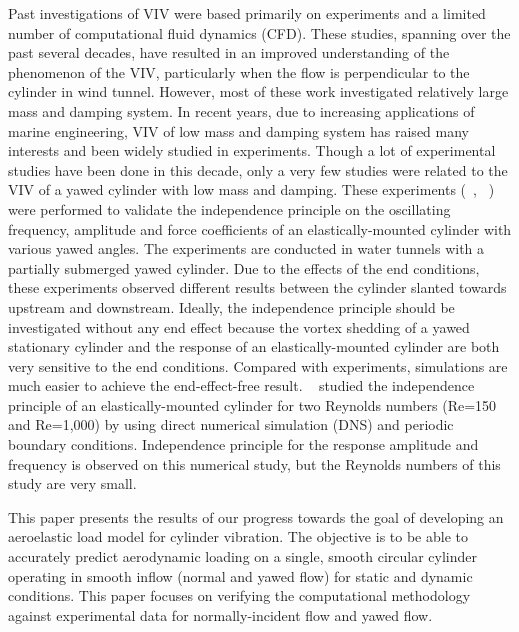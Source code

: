 \documentclass[12pt,authoryear]{elsarticle}
\begin{document}
Past investigations of VIV were based primarily on experiments and a limited
number of computational fluid dynamics (CFD). These studies, spanning over the
past several decades, have resulted in an improved understanding of the
phenomenon of the VIV, particularly when the flow is perpendicular to the
cylinder in wind tunnel.  However, most of these work investigated relatively
large mass and damping system.  In recent years, due to increasing applications
of marine engineering, VIV of low mass and damping system has raised many
interests and been widely studied in experiments. Though a lot of experimental
studies have been done in this decade, only a very few studies were related to
the VIV of a yawed cylinder with low mass and damping.  These experiments
(~\cite{jain2013vortex}, ~\cite{franzini2013one}) were performed to validate
the independence principle on the oscillating frequency, amplitude and force
coefficients of an elastically-mounted cylinder with various yawed angles. The
experiments are conducted in water tunnels with a partially submerged yawed
cylinder. Due to the effects of the end conditions, these experiments observed
different results between the cylinder slanted towards upstream and downstream.
Ideally, the independence principle should be investigated without any end
effect because the vortex shedding of a yawed stationary cylinder and the
response of an elastically-mounted cylinder are both very sensitive to the end
conditions. Compared with experiments, simulations are much easier to achieve
the end-effect-free result.  ~\cite{zhao2015validity} studied the independence
principle of an elastically-mounted cylinder for two Reynolds numbers (Re=150
and Re=1,000) by using direct numerical simulation (DNS) and periodic boundary
conditions.  Independence principle for the response amplitude and frequency is
observed on this numerical study, but the Reynolds numbers of this study are
very small.
	
This paper presents the results of our progress towards the goal of developing
an aeroelastic load model for cylinder vibration. The objective is to be able
to accurately predict aerodynamic loading on a single, smooth circular cylinder
operating in smooth inflow (normal and yawed flow) for static and dynamic
conditions. This paper focuses on verifying the computational methodology
against experimental data for normally-incident flow and yawed flow.


\end{document}
